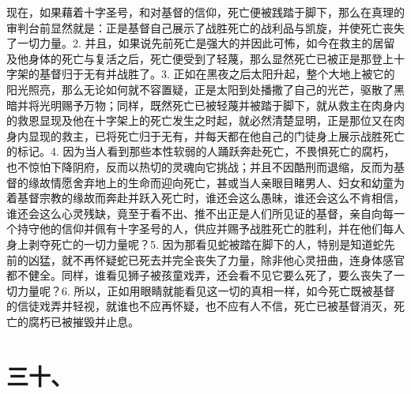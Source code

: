 现在，如果藉着十字圣号，和对基督的信仰，死亡便被践踏于脚下，那么在真理的审判台前显然就是：正是基督自己展示了战胜死亡的战利品与凯旋，并使死亡丧失了一切力量。2. 并且，如果说先前死亡是强大的并因此可怖，如今在救主的居留及他身体的死亡与复活之后，死亡便受到了轻蔑，那么显然死亡已被正是那登上十字架的基督归于无有并战胜了。3. 正如在黑夜之后太阳升起，整个大地上被它的阳光照亮，那么无论如何就不容置疑，正是太阳到处播撒了自己的光芒，驱散了黑暗并将光明赐予万物；同样，既然死亡已被轻蔑并被踏于脚下，就从救主在肉身内的救恩显现及他在十字架上的死亡发生之时起，就必然清楚显明，正是那位又在肉身内显现的救主，已将死亡归于无有，并每天都在他自己的门徒身上展示战胜死亡的标记。4. 因为当人看到那些本性软弱的人踊跃奔赴死亡，不畏惧死亡的腐朽，也不惊怕下降阴府，反而以热切的灵魂向它挑战；并且不因酷刑而退缩，反而为基督的缘故情愿舍弃地上的生命而迎向死亡，甚或当人亲眼目睹男人、妇女和幼童为着基督宗教的缘故而奔赴并跃入死亡时，谁还会这么愚昧，谁还会这么不肯相信，谁还会这么心灵残缺，竟至于看不出、推不出正是人们所见证的基督，亲自向每一个持守他的信仰并佩有十字圣号的人，供应并赐予战胜死亡的胜利，并在他们每人身上剥夺死亡的一切力量呢？5. 因为那看见蛇被踏在脚下的人，特别是知道蛇先前的凶猛，就不再怀疑蛇已死去并完全丧失了力量，除非他心灵扭曲，连身体感官都不健全。同样，谁看见狮子被孩童戏弄，还会看不见它要么死了，要么丧失了一切力量呢？6. 所以，正如用眼睛就能看见这一切的真相一样，如今死亡既被基督的信徒戏弄并轻视，就谁也不应再怀疑，也不应有人不信，死亡已被基督消灭，死亡的腐朽已被摧毁并止息。\par


\section{三十、}

